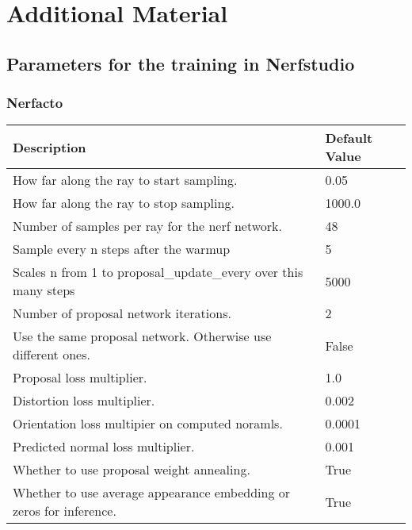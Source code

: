 \chapter{Additional Material} \label{app:additional}

\section{Parameters for the training in Nerfstudio} \label{sec:nerfstudio-train-parameters}

\subsection{Nerfacto}
\begin{table}[h]
    \begin{tabular}{|l|l|}
    \hline
    Description                                             & Default Value \\
    \hline
    How far along the ray to start sampling.                & 0.05 \\
    How far along the ray to stop sampling.                 & 1000.0 \\
    Number of samples per ray for the nerf network.         & 48 \\
    Sample every n steps after the warmup                   & 5 \\
    Scales n from 1 to proposal\_update\_every over this many steps & 5000 \\
    Number of proposal network iterations.                  & 2 \\
    Use the same proposal network. Otherwise use different ones. & False \\
    Proposal loss multiplier.                               & 1.0 \\
    Distortion loss multiplier.                             & 0.002 \\
    Orientation loss multipier on computed noramls.         & 0.0001 \\
    Predicted normal loss multiplier.                       & 0.001 \\
    Whether to use proposal weight annealing.               & True \\
    Whether to use average appearance embedding or zeros for inference. & True \\

\end{tabular}
\end{table}
